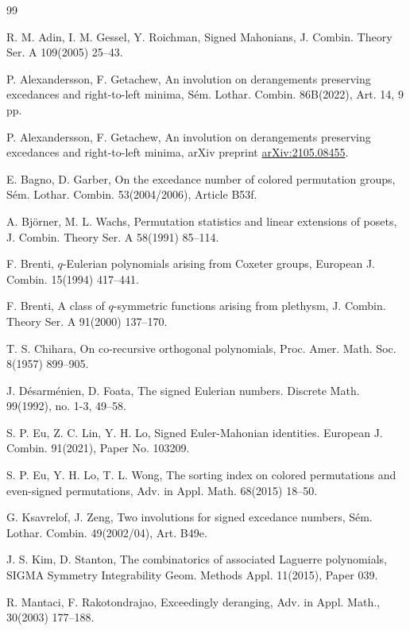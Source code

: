 \documentclass[12pt,reqno]{amsart}
\numberwithin{equation}{section}
\newcounter{num}
\begin{document}
\begin{thebibliography}{99}

R. M. Adin, I. M. Gessel, Y. Roichman, 
Signed Mahonians, 
J. Combin. Theory Ser. A 109(2005) 25--43.

P. Alexandersson, F. Getachew,
An involution on derangements preserving excedances and right-to-left minima,
S\'em. Lothar. Combin. 86B(2022), Art. 14, 9 pp. 

P. Alexandersson, F. Getachew,
An involution on derangements preserving excedances and right-to-left minima,
arXiv preprint \url{arXiv:2105.08455}.

E. Bagno, D. Garber, 
On the excedance number of colored permutation groups,
 S\'em. Lothar. Combin. 53(2004/2006), Article B53f.


A. Bj\"orner, M. L. Wachs,
Permutation statistics and linear extensions of posets,
J. Combin. Theory Ser. A 58(1991) 85--114.



F. Brenti,
$q$-Eulerian polynomials arising from Coxeter groups,
European J. Combin. 15(1994) 417--441.%

F. Brenti, 
A class of $q$-symmetric functions arising from plethysm, 
J. Combin. Theory Ser. A 91(2000) 137--170.


T. S. Chihara, 
On co-recursive orthogonal polynomials,
Proc. Amer. Math. Soc. 8(1957) 899--905.

J. D\'esarm\'enien, D. Foata,
The signed Eulerian numbers.
Discrete Math. 99(1992), no. 1-3, 49--58.

S. P. Eu,  Z. C. Lin, Y. H. Lo,
Signed Euler-Mahonian identities. 
European J. Combin. 91(2021), Paper No. 103209.

S. P. Eu, Y. H. Lo, T. L. Wong, 
The sorting index on colored permutations and even-signed permutations,
Adv. in Appl. Math. 68(2015) 18--50.

G. Ksavrelof, J. Zeng, 
Two involutions for signed excedance numbers, 
S\'em. Lothar. Combin. 49(2002/04), Art. B49e.


J. S. Kim,  D. Stanton,  
The combinatorics of associated Laguerre polynomials, 
SIGMA Symmetry Integrability Geom. Methods Appl. 11(2015), Paper 039.
 
R. Mantaci, F. Rakotondrajao, 
Exceedingly deranging, 
Adv. in Appl. Math., 30(2003) 177--188.


\end{thebibliography}
\end{document}
